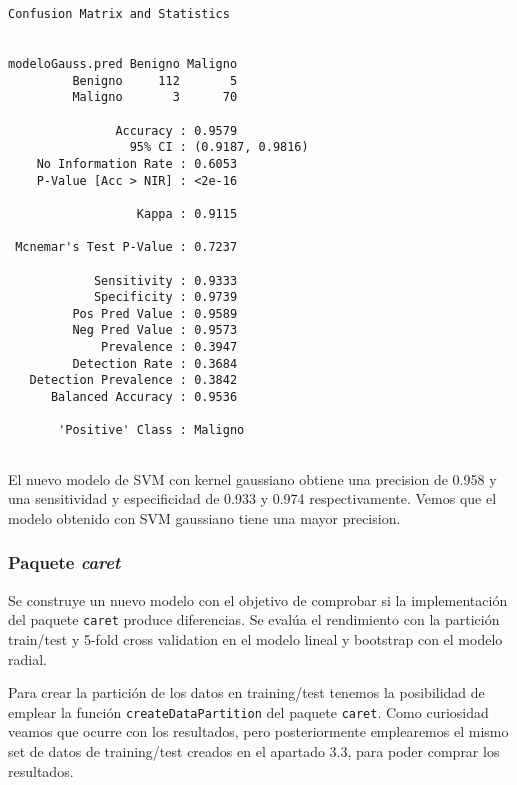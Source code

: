 \documentclass[
]{article}
\begin{document}
\begin{verbatim}
Confusion Matrix and Statistics

                
modeloGauss.pred Benigno Maligno
         Benigno     112       5
         Maligno       3      70
                                          
               Accuracy : 0.9579          
                 95% CI : (0.9187, 0.9816)
    No Information Rate : 0.6053          
    P-Value [Acc > NIR] : <2e-16          
                                          
                  Kappa : 0.9115          
                                          
 Mcnemar's Test P-Value : 0.7237          
                                          
            Sensitivity : 0.9333          
            Specificity : 0.9739          
         Pos Pred Value : 0.9589          
         Neg Pred Value : 0.9573          
             Prevalence : 0.3947          
         Detection Rate : 0.3684          
   Detection Prevalence : 0.3842          
      Balanced Accuracy : 0.9536          
                                          
       'Positive' Class : Maligno         
                                          
\end{verbatim}

El nuevo modelo de SVM con kernel gaussiano obtiene una precision de
0.958 y una sensitividad y especificidad de 0.933 y 0.974
respectivamente. Vemos que el modelo obtenido con SVM gaussiano tiene
una mayor precision.

\hypertarget{paquete-caret}{%
\subsubsection{\texorpdfstring{Paquete
\emph{caret}}{Paquete caret}}\label{paquete-caret}}

Se construye un nuevo modelo con el objetivo de comprobar si la
implementación del paquete \texttt{caret} produce diferencias. Se evalúa
el rendimiento con la partición train/test y 5-fold cross validation en
el modelo lineal y bootstrap con el modelo radial.

Para crear la partición de los datos en training/test tenemos la
posibilidad de emplear la función \texttt{createDataPartition} del
paquete \texttt{caret}. Como curiosidad veamos que ocurre con los
resultados, pero posteriormente emplearemos el mismo set de datos de
training/test creados en el apartado 3.3, para poder comprar los
resultados.
\end{document}
